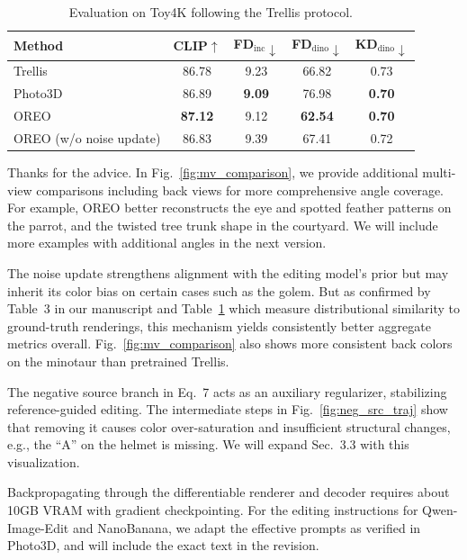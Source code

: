 \documentclass[10pt,twocolumn,letterpaper]{article}
\newif\ifshowreviewtags
\newcommand{\reviewtag}[1]{\ifshowreviewtags{\textcolor{eccvblue}{\scriptsize [#1]}}\fi}
\begin{document}
\begin{table}[t]
\vspace{-1mm}
\centering\scriptsize
\begin{tabular}{lcccc}
\toprule
Method & CLIP$\uparrow$ & FD$_{\text{inc}}\downarrow$ & FD$_{\text{dino}}\downarrow$ & KD$_{\text{dino}}\downarrow$ \\
\midrule
Trellis & 86.78 & 9.23 & 66.82 & 0.73 \\
Photo3D & 86.89 & \textbf{9.09} & 76.98 & \textbf{0.70} \\
\midrule
OREO & \textbf{87.12} & 9.12 & \textbf{62.54} & \textbf{0.70} \\
OREO (w/o noise update) & 86.83 & 9.39 & 67.41 & 0.72 \\
\bottomrule
\end{tabular}
\caption{Evaluation on Toy4K following the Trellis protocol.}
\label{tab:toy4k}
\vspace{-3mm}
\end{table}

 \reviewtag{R3-Qual1}
Thanks for the advice. In Fig.~\ref{fig:mv_comparison}, we provide additional multi-view comparisons including back views for more comprehensive angle coverage. For example, OREO better reconstructs the eye and spotted feather patterns on the parrot, and the twisted tree trunk shape in the courtyard. We will include more examples with additional angles in the next version.

 \reviewtag{R3-Qual2}
The noise update strengthens alignment with the editing model's prior but may inherit its color bias on certain cases such as the golem.
But as confirmed by Table~3 in our manuscript and Table~\ref{tab:toy4k} which measure distributional similarity to ground-truth renderings, this mechanism yields consistently better aggregate metrics overall. Fig.~\ref{fig:mv_comparison} also shows more consistent back colors on the minotaur than pretrained Trellis.

 \reviewtag{R3-Clar1}
The negative source branch in Eq.~7 acts as an auxiliary regularizer, stabilizing reference-guided editing.
The intermediate steps in Fig.~\ref{fig:neg_src_traj} show that removing it causes color over-saturation and insufficient structural changes, e.g., the ``A'' on the helmet is missing.
We will expand Sec.~3.3 with this visualization.

 \reviewtag{R3-Clar2, R3-Clar3, R3-Min1, R3-Min2}
Backpropagating through the differentiable renderer and decoder requires about 10GB VRAM with gradient checkpointing.
For the editing instructions for Qwen-Image-Edit and NanoBanana, we adapt the effective prompts as verified in Photo3D, and will include the exact text in the revision.
\end{document}
